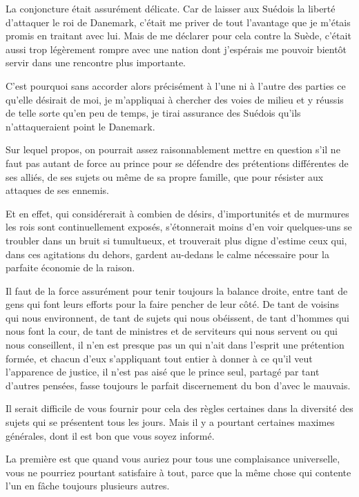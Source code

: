 \documentclass[french,twoside]{book} %
\begin{document}
La conjoncture était assurément délicate. Car de laisser aux Suédois la liberté d’attaquer le roi de Danemark, c’était me priver de tout l’avantage que je m’étais promis en traitant avec lui. Mais de me déclarer pour cela contre la Suède, c’était aussi trop légèrement rompre avec une nation dont j’espérais me pouvoir bientôt servir dans une rencontre plus importante.\par
C’est pourquoi sans accorder alors précisément à l’une ni à l’autre des parties ce qu’elle désirait de moi, je m’appliquai à chercher des voies de milieu et y réussis de telle sorte qu’en peu de temps, je tirai assurance des Suédois qu’ils n’attaqueraient point le Danemark.\par
Sur lequel propos, on pourrait assez raisonnablement mettre en question s’il ne faut pas autant de force au prince pour se défendre des prétentions différentes de ses alliés, de ses sujets ou même de sa propre famille, que pour résister aux attaques de ses ennemis.\par
Et en effet, qui considérerait à combien de désirs, d’importunités et de murmures les rois sont continuellement exposés, s’étonnerait moins d’en voir quelques-uns se troubler dans un bruit si tumultueux, et trouverait plus digne d’estime ceux qui, dans ces agitations du dehors, gardent au-dedans le calme nécessaire pour la parfaite économie de la raison.\par
Il faut de la force assurément pour tenir toujours la balance droite, entre tant de gens qui font leurs efforts pour la faire pencher de leur côté. De tant de voisins qui nous environnent, de tant de sujets qui nous obéissent, de tant d’hommes qui nous font la cour, de tant de ministres et de serviteurs qui nous servent ou qui nous conseillent, il n’en est presque pas un qui n’ait dans l’esprit une prétention formée, et chacun d’eux s’appliquant tout entier à donner à ce qu’il veut l’apparence de justice, il n’est pas aisé que le prince seul, partagé par tant d’autres pensées, fasse toujours le parfait discernement du bon d’avec le mauvais.\par
Il serait difficile de vous fournir pour cela des règles certaines dans la diversité des sujets qui se présentent tous les jours. Mais il y a pourtant certaines maximes générales, dont il est bon que vous soyez informé.\par
La première est que quand vous auriez pour tous une complaisance universelle, vous ne pourriez pourtant satisfaire à tout, parce que la même chose qui contente l’un en fâche toujours plusieurs autres.\par
\end{document}
